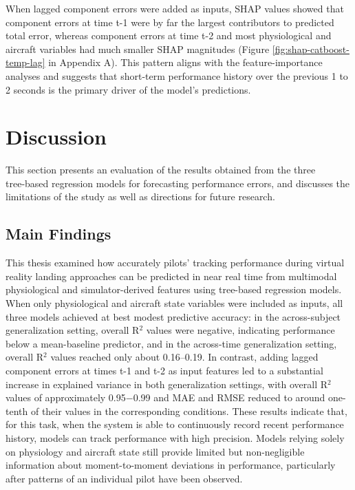 \documentclass[11pt, a4paper]{article}
\begin{document}
When lagged component errors were added as inputs, SHAP values showed that component errors at time t-1 were by far the largest contributors to predicted total error, whereas component errors at time t-2 and most physiological and aircraft variables had much smaller SHAP magnitudes (Figure \ref{fig:shap-catboost-temp-lag} in Appendix A). This pattern aligns with the feature-importance analyses and suggests that short-term performance history over the previous 1 to 2 seconds is the primary driver of the model’s predictions.


\section{Discussion}
This section presents an evaluation of the results obtained from the three tree‑based regression models for forecasting performance errors, and discusses the limitations of the study as well as directions for future research.

\subsection{Main Findings}
This thesis examined how accurately pilots’ tracking performance during virtual reality landing approaches can be predicted in near real time from multimodal physiological and simulator-derived features using tree-based regression models. When only physiological and aircraft state variables were included as inputs, all three models achieved at best modest predictive accuracy: in the across-subject generalization setting, overall R$^2$ values were negative, indicating performance below a mean-baseline predictor, and in the across-time generalization setting, overall R$^2$ values reached only about 0.16–0.19. In contrast, adding lagged component errors at times t-1 and t-2 as input features led to a substantial increase in explained variance in both generalization settings, with overall R$^2$ values of approximately 0.95$-$0.99 and MAE and RMSE reduced to around one-tenth of their values in the corresponding conditions. These results indicate that, for this task, when the system is able to continuously record recent performance history, models can track performance with high precision. Models relying solely on physiology and aircraft state still provide limited but non-negligible information about moment-to-moment deviations in performance, particularly after patterns of an individual pilot have been observed.
\end{document}
